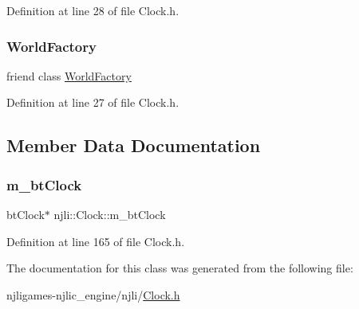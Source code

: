 Definition at line 28 of file Clock.\+h.

\mbox{\label{classnjli_1_1_clock_acb96ebb09abe8f2a37a915a842babfac}} 
\subsubsection{\texorpdfstring{World\+Factory}{WorldFactory}}
{\footnotesize\ttfamily friend class \mbox{\hyperlink{classnjli_1_1_world_factory}{World\+Factory}}\hspace{0.3cm}{\ttfamily [friend]}}



Definition at line 27 of file Clock.\+h.



\subsection{Member Data Documentation}
\mbox{\label{classnjli_1_1_clock_ab107f00a19c387d5b34d4a2fb92d8370}} 
\subsubsection{\texorpdfstring{m\+\_\+bt\+Clock}{m\_btClock}}
{\footnotesize\ttfamily bt\+Clock$\ast$ njli\+::\+Clock\+::m\+\_\+bt\+Clock\hspace{0.3cm}{\ttfamily [private]}}



Definition at line 165 of file Clock.\+h.



The documentation for this class was generated from the following file\+:\begin{DoxyCompactItemize}
\item 
njligames-\/njlic\+\_\+engine/njli/\mbox{\hyperlink{_clock_8h}{Clock.\+h}}\end{DoxyCompactItemize}

